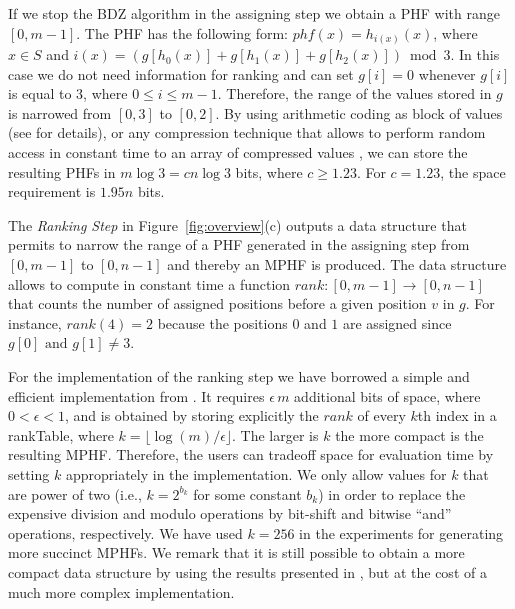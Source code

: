 If we stop the BDZ algorithm in the assigning step
we obtain a PHF with range $[0,m-1]$.
The PHF has the following form:
$phf(x) = h_{i(x)}(x)$, where $x\in S$ and $i(x) = (g[h_0(x)] + g[h_1(x)] + g[h_2(x)]) \bmod 3$.
In this case we do not need information for ranking and
can set $g[i] = 0$ whenever $g[i]$ is equal to 3, where $0 \le i \le m-1$.
Therefore, the range of the values stored in $g$ is narrowed 
from $[0,3]$ to $[0,2]$. By using arithmetic coding as block of 
values (see \cite{b08,bpz07} for details),
or any compression technique that allows to perform 
random access in constant time to an array of compressed values \cite{fn07,gn06,sg06},
we can store the resulting PHFs in $m\log 3  = c n\log 3$ bits, 
where $c \ge 1.23$. For $c = 1.23$, the space requirement is $1.95n$ bits.


The {\em Ranking Step} in Figure~\ref{fig:overview}(c)
outputs a data structure 
that permits to narrow the range of a PHF generated in the
assigning step from $[0,m-1]$ to $[0,n-1]$ and thereby 
an MPHF is produced.
The data structure allows to compute in constant time 
a function $\mathit{rank}\!\!:[0,m-1]\to [0,n-1]$ 
that counts the number of assigned positions 
before a given position $v$ in $g$.
For instance, $\mathit{rank}(4) = 2$ because 
the positions $0$ and $1$ are assigned 
since $g[0] \text{ and } g[1] \not = 3$.

For the implementation of the ranking step 
we have borrowed 
a simple and efficient implementation from
\cite{dict-jour}. 
It requires $\epsilon \, m$ additional bits of space, where $0 < \epsilon < 1$,
and is obtained by storing explicitly the
$\mathit{rank}$ of every $k$th index in a rankTable, where $k
=\lfloor\log(m)/\epsilon\rfloor$.
The larger is $k$ the more compact is the resulting MPHF.
Therefore, the users can tradeoff space for evaluation time
by setting $k$ appropriately in the implementation. 
We only allow values for $k$
that are power of two (i.e., $k=2^{b_k}$ for some constant $b_k$) in order to replace the expensive
division and modulo operations by 
bit-shift and bitwise ``and'' operations, respectively.
We have used $k=256$ 
in the experiments
for generating more succinct MPHFs.
We remark that it is still possible to obtain a more compact data structure by 
using the results presented in \cite{os07,rrr02}, but at the cost of a much more
complex implementation.

